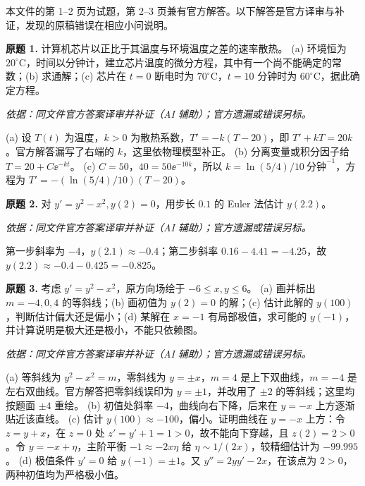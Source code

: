 本文件的第 1--2 页为试题，第 2--3 页兼有官方解答。以下解答是官方译审与补证，发现的原稿错误在相应小问说明。
\begin{exercise}\label{cw:prex1-1}\textbf{原题 1.} 计算机芯片以正比于其温度与环境温度之差的速率散热。
(a) 环境恒为 $20^\circ\mathrm C$，时间以分钟计，建立芯片温度的微分方程，其中有一个尚不能确定的常数；(b) 求通解；(c) 芯片在 $t=0$ 断电时为 $70^\circ\mathrm C$，$t=10$ 分钟时为 $60^\circ\mathrm C$，据此确定方程。
\end{exercise}
\begin{solution}
\textit{依据：同文件官方答案译审并补证（AI 辅助）；官方遗漏或错误另标。}\par
(a) 设 $T(t)$ 为温度，$k>0$ 为散热系数，$T'=-k(T-20)$，即 $T'+kT=20k$。官方解答漏写了右端的 $k$，这里依物理模型补正。
(b) 分离变量或积分因子给 $T=20+C\ee^{-kt}$。
(c) $C=50$，$40=50\ee^{-10k}$，所以 $k=\ln(5/4)/10\ \text{分钟}^{-1}$，方程为 $T'=-(\ln(5/4)/10)(T-20)$。
\end{solution}
\begin{exercise}\label{cw:prex1-2}\textbf{原题 2.} 对 $y'=y^2-x^2,y(2)=0$，用步长 $0.1$ 的 Euler 法估计 $y(2.2)$。
\end{exercise}
\begin{solution}
\textit{依据：同文件官方答案译审并补证（AI 辅助）；官方遗漏或错误另标。}\par
第一步斜率为 $-4$，$y(2.1)\approx-0.4$；第二步斜率 $0.16-4.41=-4.25$，故 $y(2.2)\approx-0.4-0.425=-0.825$。
\end{solution}
\begin{exercise}\label{cw:prex1-3}\textbf{原题 3.} 考虑 $y'=y^2-x^2$，原方向场绘于 $-6\le x,y\le6$。
(a) 画并标出 $m=-4,0,4$ 的等斜线；(b) 画初值为 $y(2)=0$ 的解；(c) 估计此解的 $y(100)$，判断估计偏大还是偏小；(d) 某解在 $x=-1$ 有局部极值，求可能的 $y(-1)$，并计算说明是极大还是极小，不能只依赖图。
\end{exercise}
\begin{solution}
\textit{依据：同文件官方答案译审并补证（AI 辅助）；官方遗漏或错误另标。}\par
(a) 等斜线为 $y^2-x^2=m$，零斜线为 $y=\pm x$，$m=4$ 是上下双曲线，$m=-4$ 是左右双曲线。官方解答把零斜线误印为 $y=\pm1$，并改用了 $\pm2$ 的等斜线；这里均按题面 $\pm4$ 重绘。
(b) 初值处斜率 $-4$，曲线向右下降，后来在 $y=-x$ 上方逐渐贴近该直线。\ODEExamPracticeField
(c) 估计 $y(100)\approx-100$，偏小。证明曲线在 $y=-x$ 上方：令 $z=y+x$，在 $z=0$ 处 $z'=y'+1=1>0$，故不能向下穿越，且 $z(2)=2>0$。令 $y=-x+\eta$，主阶平衡 $-1\approx-2x\eta$ 给 $\eta\sim1/(2x)$，较精细估计为 $-99.995$。
(d) 极值条件 $y'=0$ 给 $y(-1)=\pm1$。又 $y''=2yy'-2x$，在该点为 $2>0$，两种初值均为严格极小值。
\end{solution}
